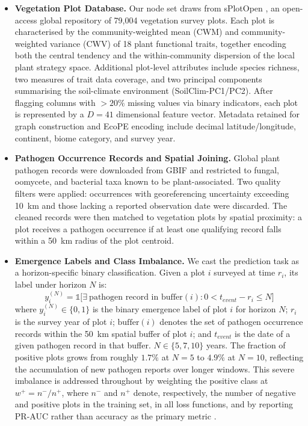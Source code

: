 \documentclass[a4paper,fleqn]{cas-sc}
\begin{document}
\begin{itemize}[leftmargin=1.4em]

\item \textbf{Vegetation Plot Database.} Our node set draws from sPlotOpen \citep{sabatini2021}, an open-access global repository of 79{,}004 vegetation survey plots. Each plot is characterised by the community-weighted mean (CWM) and community-weighted variance (CWV) of 18 plant functional traits, together encoding both the central tendency and the within-community dispersion of the local plant strategy space. Additional plot-level attributes include species richness, two measures of trait data coverage, and two principal components summarising the soil-climate environment (SoilClim-PC1/PC2). After flagging columns with $>20\%$ missing values via binary indicators, each plot is represented by a $D=41$ dimensional feature vector. Metadata retained for graph construction and EcoPE encoding include decimal latitude/longitude, continent, biome category, and survey year.

\item \textbf{Pathogen Occurrence Records and Spatial Joining.} Global plant pathogen records were downloaded from GBIF \citep{gbif2023} and restricted to fungal, oomycete, and bacterial taxa known to be plant-associated. Two quality filters were applied: occurrences with georeferencing uncertainty exceeding 10~km and those lacking a reported observation date were discarded. The cleaned records were then matched to vegetation plots by spatial proximity: a plot receives a pathogen occurrence if at least one qualifying record falls within a 50~km radius of the plot centroid.

\item \textbf{Emergence Labels and Class Imbalance.} We cast the prediction task as a horizon-specific binary classification. Given a plot $i$ surveyed at time $r_i$, its label under horizon $N$ is:
\begin{equation}
y_i^{(N)} = \mathbb{1}\Big[\exists\ \text{pathogen record in buffer}(i): 0 < t_{event} - r_i \leq N \Big]
\end{equation}
where $y_i^{(N)} \in \{0,1\}$ is the binary emergence label of plot $i$ for horizon $N$; $r_i$ is the survey year of plot $i$; $\text{buffer}(i)$ denotes the set of pathogen occurrence records within the 50~km spatial buffer of plot $i$; and $t_{event}$ is the date of a given pathogen record in that buffer. $N \in \{5, 7, 10\}$ years. The fraction of positive plots grows from roughly $1.7\%$ at $N=5$ to $4.9\%$ at $N=10$, reflecting the accumulation of new pathogen reports over longer windows. This severe imbalance is addressed throughout by weighting the positive class at $w^+ = n^-/n^+$, where $n^-$ and $n^+$ denote, respectively, the number of negative and positive plots in the training set, in all loss functions, and by reporting PR-AUC rather than accuracy as the primary metric \citep{saito2015}.


\end{itemize}
\end{document}
